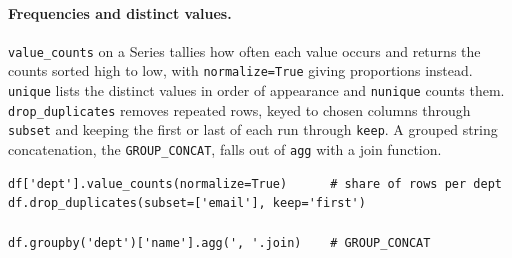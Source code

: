 \paragraph{Frequencies and distinct values.} \texttt{value\_counts} on a Series tallies how often each value occurs and returns the counts sorted high to low, with \texttt{normalize=True} giving proportions instead. \texttt{unique} lists the distinct values in order of appearance and \texttt{nunique} counts them. \texttt{drop\_duplicates} removes repeated rows, keyed to chosen columns through \texttt{subset} and keeping the first or last of each run through \texttt{keep}. A grouped string concatenation, the \texttt{GROUP\_CONCAT}, falls out of \texttt{agg} with a join function.

\begin{lstlisting}[style=python, caption={Frequencies, distinct rows, and joined strings}]
df['dept'].value_counts(normalize=True)      # share of rows per dept
df.drop_duplicates(subset=['email'], keep='first')

df.groupby('dept')['name'].agg(', '.join)    # GROUP_CONCAT
\end{lstlisting}
